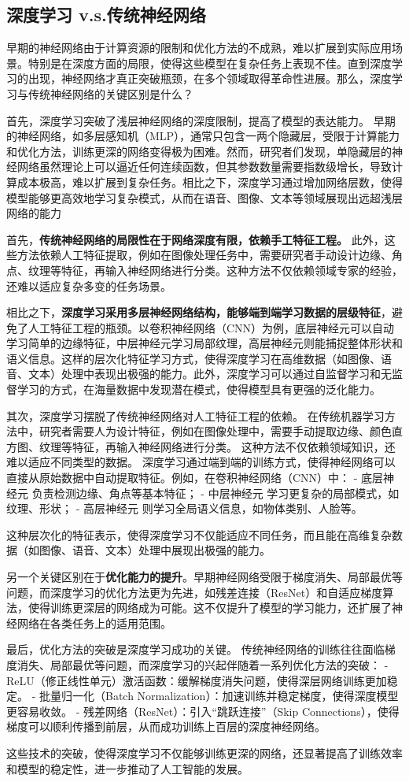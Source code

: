 \subsection{深度学习 v.s.传统神经网络}

早期的神经网络由于计算资源的限制和优化方法的不成熟，难以扩展到实际应用场景。特别是在深度方面的局限，使得这些模型在复杂任务上表现不佳。直到深度学习的出现，神经网络才真正突破瓶颈，在多个领域取得革命性进展。那么，深度学习与传统神经网络的关键区别是什么？


首先，深度学习突破了浅层神经网络的深度限制，提高了模型的表达能力。 早期的神经网络，如多层感知机（MLP），通常只包含一两个隐藏层，受限于计算能力和优化方法，训练更深的网络变得极为困难。然而，研究者们发现，单隐藏层的神经网络虽然理论上可以逼近任何连续函数，但其参数数量需要指数级增长，导致计算成本极高，难以扩展到复杂任务。相比之下，深度学习通过增加网络层数，使得模型能够更高效地学习复杂模式，从而在语音、图像、文本等领域展现出远超浅层网络的能力

首先，{\bf 传统神经网络的局限性在于网络深度有限，依赖手工特征工程。} 
此外，这些方法依赖人工特征提取，例如在图像处理任务中，需要研究者手动设计边缘、角点、纹理等特征，再输入神经网络进行分类。这种方法不仅依赖领域专家的经验，还难以适应复杂多变的任务场景。

相比之下，{\bf 深度学习采用多层神经网络结构，能够端到端学习数据的层级特征}，避免了人工特征工程的瓶颈。以卷积神经网络（CNN）为例，底层神经元可以自动学习简单的边缘特征，中层神经元学习局部纹理，高层神经元则能捕捉整体形状和语义信息。这样的层次化特征学习方式，使得深度学习在高维数据（如图像、语音、文本）处理中表现出极强的能力。此外，深度学习可以通过自监督学习和无监督学习的方式，在海量数据中发现潜在模式，使得模型具有更强的泛化能力。

其次，深度学习摆脱了传统神经网络对人工特征工程的依赖。 在传统机器学习方法中，研究者需要人为设计特征，例如在图像处理中，需要手动提取边缘、颜色直方图、纹理等特征，再输入神经网络进行分类。 这种方法不仅依赖领域知识，还难以适应不同类型的数据。
深度学习通过端到端的训练方式，使得神经网络可以直接从原始数据中自动提取特征。例如，在卷积神经网络（CNN）中：
- 底层神经元 负责检测边缘、角点等基本特征；
- 中层神经元 学习更复杂的局部模式，如纹理、形状；
- 高层神经元 则学习全局语义信息，如物体类别、人脸等。

这种层次化的特征表示，使得深度学习不仅能适应不同任务，而且能在高维复杂数据（如图像、语音、文本）处理中展现出极强的能力。

另一个关键区别在于{\bf 优化能力的提升}。早期神经网络受限于梯度消失、局部最优等问题，而深度学习的优化方法更为先进，如残差连接（ResNet）和自适应梯度算法，使得训练更深层的网络成为可能。这不仅提升了模型的学习能力，还扩展了神经网络在各类任务上的适用范围。

最后，优化方法的突破是深度学习成功的关键。 传统神经网络的训练往往面临梯度消失、局部最优等问题，而深度学习的兴起伴随着一系列优化方法的突破：
- ReLU（修正线性单元）激活函数：缓解梯度消失问题，使得深层网络训练更加稳定。
- 批量归一化（Batch Normalization）：加速训练并稳定梯度，使得深度模型更容易收敛。
- 残差网络（ResNet）：引入“跳跃连接”（Skip Connections），使得梯度可以顺利传播到前层，从而成功训练上百层的深度神经网络。

这些技术的突破，使得深度学习不仅能够训练更深的网络，还显著提高了训练效率和模型的稳定性，进一步推动了人工智能的发展。
